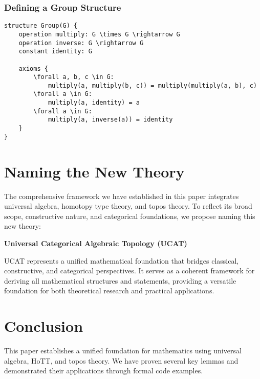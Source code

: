 \documentclass{article}
\begin{document}
\subsubsection{Defining a Group Structure}

\begin{lstlisting}
structure Group(G) {
    operation multiply: G \times G \rightarrow G
    operation inverse: G \rightarrow G
    constant identity: G

    axioms {
        \forall a, b, c \in G:
            multiply(a, multiply(b, c)) = multiply(multiply(a, b), c)
        \forall a \in G:
            multiply(a, identity) = a
        \forall a \in G:
            multiply(a, inverse(a)) = identity
    }
}
\end{lstlisting}

\section{Naming the New Theory}

The comprehensive framework we have established in this paper integrates universal algebra, homotopy type theory, and topos theory. To reflect its broad scope, constructive nature, and categorical foundations, we propose naming this new theory:

\begin{center}
    \textbf{Universal Categorical Algebraic Topology (UCAT)}
\end{center}

\noindent UCAT represents a unified mathematical foundation that bridges classical, constructive, and categorical perspectives. It serves as a coherent framework for deriving all mathematical structures and statements, providing a versatile foundation for both theoretical research and practical applications.

\section{Conclusion}

This paper establishes a unified foundation for mathematics using universal algebra, HoTT, and topos theory. We have proven several key lemmas and demonstrated their applications through formal code examples.
\end{document}
